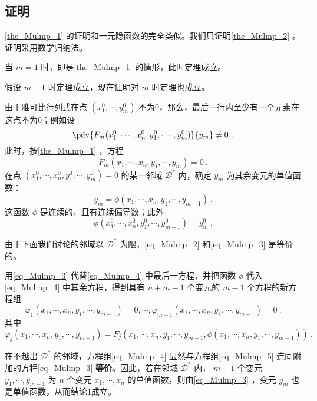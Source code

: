 \subsection{证明}
\autoref{the_Mulmp_1} 的证明和一元隐函数的完全类似。我们只证明\autoref{the_Mulmp_2} 。证明采用数学归纳法。

当 $m=1$ 时，即是\autoref{the_Mulmp_1} 的情形，此时定理成立。

假设 $m-1$ 时定理成立，现在证明对 $m$ 时定理也成立。

由于雅可比行列式在点 $(x_1^0,\cdots,y_m^0)$ 不为0，那么，最后一行内至少有一个元素在这点不为0；例如设
\begin{equation}
\pdv{F_m(x_1^0,\cdots,x_n^0,y_1^0,\cdots,y_m^0)}{y_m}\neq0~.
\end{equation}
此时，按\autoref{the_Mulmp_1} ，方程
\begin{equation}\label{eq_Mulmp_2}
F_m(x_1,\cdots,x_n,y_1,\cdots,y_m)=0~.
\end{equation}
在点 $(x_1^0,\cdots,x_n^0,y_1^0,\cdots,y_m^0)=0$ 的某一邻域 $\mathcal{D}^*$ 内，确定 $y_m$ 为其余变元的单值函数：
\begin{equation}\label{eq_Mulmp_3}
y_m=\phi(x_1,\cdots,x_n,y_1,\cdots,y_{m-1})~.
\end{equation}
这函数 $\phi$ 是连续的，且有连续偏导数；此外
\begin{equation}
\phi(x_1^0,\cdots,x_n^0,y_1^0,\cdots,y_{m-1}^0)=y_m^0~.
\end{equation}

由于下面我们讨论的邻域以 $\mathcal{D}^*$ 为限，\autoref{eq_Mulmp_2} 和\autoref{eq_Mulmp_3} 是等价的。

用\autoref{eq_Mulmp_3} 代替\autoref{eq_Mulmp_4} 中最后一方程，并把函数 $\phi$ 代入\autoref{eq_Mulmp_4} 中其余方程，得到具有 $n+m-1$ 个变元的 $m-1$ 个方程的新方程组
\begin{equation}\label{eq_Mulmp_5}
\varphi_1(x_1,\cdots,x_n,y_1,\cdots,y_{m-1})=0,\cdots,\varphi_{m-1}(x_1,\cdots,x_n,y_1,\cdots,y_{m-1})=0~.
\end{equation}
其中
\begin{equation}\label{eq_Mulmp_6}\varphi_j(x_1,\cdots,x_n,y_1,\cdots,y_{m-1})=F_j(x_1,\cdots,x_n,y_1,\cdots,y_{m-1},\phi(x_1,\cdots,x_n,y_1,\cdots,y_{m-1}))~.
\end{equation}

在不越出 $\mathcal{D}^*$ 的邻域，方程组\autoref{eq_Mulmp_4} 显然与方程组\autoref{eq_Mulmp_5} 连同附加的方程\autoref{eq_Mulmp_3} \textbf{等价}。因此，若在邻域 $\mathcal{D}^*$ 内， $m-1$ 个变元 $y_1,\cdots,y_{m-1}$ 为 $n$ 个变元 $x_1,\cdots,x_n$ 的单值函数，则由\autoref{eq_Mulmp_3} ，变元 $y_m$ 也是单值函数，从而结论1成立。

